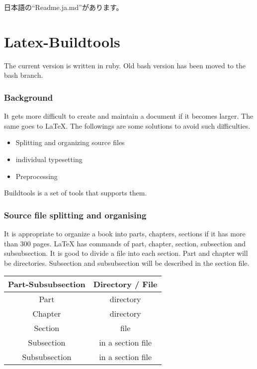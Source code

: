 \documentclass[
]{article}
\author{}
\date{}
\providecommand{\tightlist}{%
  \setlength{\itemsep}{0pt}\setlength{\parskip}{0pt}}
\begin{document}
日本語の``Readme.ja.md''があります。

\hypertarget{latex-buildtools}{%
\section{Latex-Buildtools}\label{latex-buildtools}}

The current version is written in ruby. Old bash version has been moved
to the bash branch.

\hypertarget{background}{%
\subsubsection{Background}\label{background}}

It gets more difficult to create and maintain a document if it becomes
larger. The same goes to LaTeX. The followings are some solutions to
avoid such difficulties.

\begin{itemize}
\tightlist
\item
  Splitting and organizing source files
\item
  individual typesetting
\item
  Preprocessing
\end{itemize}

Buildtools is a set of tools that supports them.

\hypertarget{source-file-splitting-and-organising}{%
\subsubsection{Source file splitting and
organising}\label{source-file-splitting-and-organising}}

It is appropriate to organize a book into parts, chapters, sections if
it has more than 300 pages. LaTeX has commands of part, chapter,
section, subsection and subsubsection. It is good to divide a file into
each section. Part and chapter will be directories. Subsection and
subsubsection will be described in the section file.

\begin{longtable}[]{@{}cc@{}}
\toprule
Part-Subsubsection & Directory / File\tabularnewline
\midrule
\endhead
Part & directory\tabularnewline
Chapter & directory\tabularnewline
Section & file\tabularnewline
Subsection & in a section file\tabularnewline
Subsubsection & in a section file\tabularnewline
\bottomrule
\end{longtable}
\end{document}
